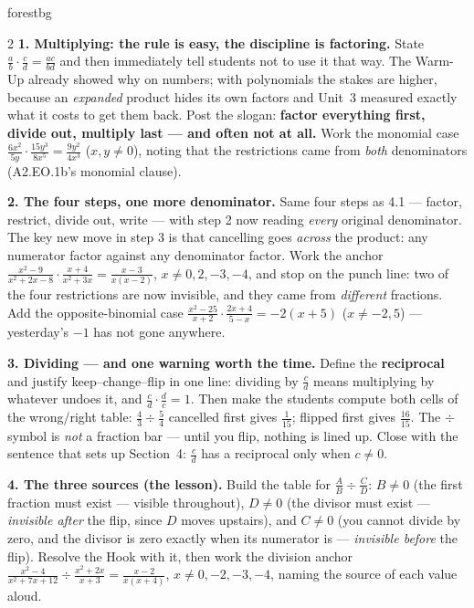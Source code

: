 \documentclass[10pt]{article}
\begin{document}
\begin{skillbox}[Lesson]{forestbg}
\begin{multicols}{2}
\textbf{1. Multiplying: the rule is easy, the discipline is factoring.} State
$\frac ab\cdot\frac cd=\frac{ac}{bd}$ and then immediately tell students not to use it that way. The
Warm-Up already showed why on numbers; with polynomials the stakes are higher, because an
\emph{expanded} product hides its own factors and Unit~3 measured exactly what it costs to get them
back. Post the slogan: \textbf{factor everything first, divide out, multiply last --- and often not at
all.} Work the monomial case $\frac{6x^2}{5y}\cdot\frac{15y^3}{8x^5}=\frac{9y^2}{4x^3}$ ($x,y\neq0$),
noting that the restrictions came from \emph{both} denominators (A2.EO.1b's monomial clause).

\textbf{2. The four steps, one more denominator.} Same four steps as 4.1 --- factor, restrict, divide
out, write --- with step 2 now reading \emph{every} original denominator. The key new move in step 3 is
that cancelling goes \emph{across} the product: any numerator factor against any denominator factor.
Work the anchor
$\frac{x^2-9}{x^2+2x-8}\cdot\frac{x+4}{x^2+3x}=\frac{x-3}{x(x-2)}$, $x\neq0,2,-3,-4$, and stop on the
punch line: two of the four restrictions are now invisible, and they came from \emph{different}
fractions. Add the opposite-binomial case $\frac{x^2-25}{x+2}\cdot\frac{2x+4}{5-x}=-2(x+5)$
($x\neq-2,5$) --- yesterday's $-1$ has not gone anywhere.

\columnbreak

\textbf{3. Dividing --- and one warning worth the time.} Define the \textbf{reciprocal} and justify
keep--change--flip in one line: dividing by $\frac cd$ means multiplying by whatever undoes it, and
$\frac cd\cdot\frac dc=1$. Then make the students compute both cells of the wrong/right table:
$\frac43\div\frac54$ cancelled first gives $\frac{1}{15}$; flipped first gives $\frac{16}{15}$. The
$\div$ symbol is \emph{not} a fraction bar --- until you flip, nothing is lined up. Close with the
sentence that sets up Section~4: $\frac cd$ has a reciprocal only when $c\neq0$.

\textbf{4. The three sources (the lesson).} Build the table for $\frac AB\div\frac CD$: $B\neq0$ (the
first fraction must exist --- visible throughout), $D\neq0$ (the divisor must exist --- \emph{invisible
after} the flip, since $D$ moves upstairs), and $C\neq0$ (you cannot divide by zero, and the divisor is
zero exactly when its numerator is --- \emph{invisible before} the flip). Resolve the Hook with it, then
work the division anchor $\frac{x^2-4}{x^2+7x+12}\div\frac{x^2+2x}{x+3}=\frac{x-2}{x(x+4)}$,
$x\neq0,-2,-3,-4$, naming the source of each value aloud.


\end{multicols}
\end{skillbox}
\end{document}
